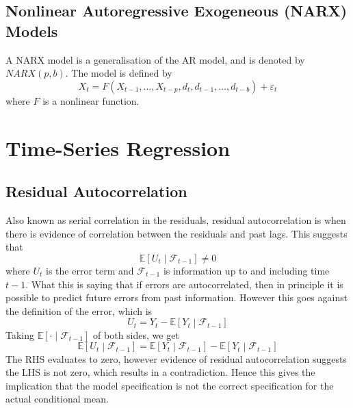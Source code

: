 \documentclass[11pt]{report} %
\begin{document}
\subsection{Nonlinear Autoregressive Exogeneous (NARX) Models}
A NARX model is a generalisation of the AR model, and is denoted by $NARX\left(p, b\right)$. The model is defined by
\begin{equation}
X_{t} = F\left(X_{t - 1}, \dots, X_{t - p}, d_{t}, d_{t - 1}, \dots, d_{t - b}\right) + \varepsilon_{t}
\end{equation}
where $F$ is a nonlinear function.

\section{Time-Series Regression}

\subsection{Residual Autocorrelation}

Also known as serial correlation in the residuals, residual autocorrelation is when there is evidence of correlation between the residuals and past lags. This suggests that
\begin{equation}
\mathbb{E}\left[U_{t}\middle|\mathcal{F}_{t - 1}\right] \neq 0
\end{equation}
where $U_{t}$ is the error term and $\mathcal{F}_{t - 1}$ is information up to and including time $t - 1$. What this is saying that if errors are autocorrelated, then in principle it is possible to predict future errors from past information. However this goes against the definition of the error, which is
\begin{equation}
U_{t} = Y_{t} - \mathbb{E}\left[Y_{t}\middle|\mathcal{F}_{t - 1}\right]
\end{equation}
Taking $\mathbb{E}\left[\cdot\middle|\mathcal{F}_{t - 1}\right]$ of both sides, we get
\begin{equation}
\mathbb{E}\left[U_{t}\middle|\mathcal{F}_{t - 1}\right] = \mathbb{E}\left[Y_{t}\middle|\mathcal{F}_{t - 1}\right] - \mathbb{E}\left[Y_{t}\middle|\mathcal{F}_{t - 1}\right]
\end{equation}
The RHS evaluates to zero, however evidence of residual autocorrelation suggests the LHS is not zero, which results in a contradiction. Hence this gives the implication that the model specification is not the correct specification for the actual conditional mean.
\end{document}

